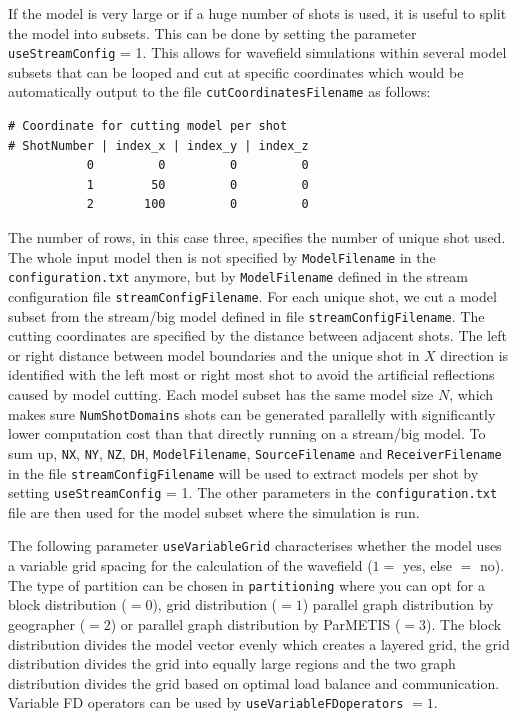 \documentclass[pdftex,a4paper,parskip,listof=totoc,bibliography=totoc,onehalfspacing,12pt]{scrreprt}
\newcommand{\shellcmd}[1]{\indent\indent\texttt{#1}}	%
\begin{document}
If the model is very large or if a huge number of shots is used, it is useful to split the model into subsets. This can be done by setting the parameter \verb+useStreamConfig+ = 1. This allows for wavefield simulations within several model subsets that can be looped and cut at specific coordinates which would be automatically output to the file \verb+cutCoordinatesFilename+ as follows:
\begin{verbatim}
# Coordinate for cutting model per shot 
# ShotNumber | index_x | index_y | index_z
           0         0         0         0
           1        50         0         0
           2       100         0         0
\end{verbatim}
The number of rows, in this case three, specifies the number of unique shot used. The whole input model then is not specified by \verb+ModelFilename+ in the \shellcmd{configuration.txt} anymore, but by \verb+ModelFilename+ defined in the stream configuration file \verb+streamConfigFilename+. For each unique shot, we cut a model subset from the stream/big model defined in file \verb+streamConfigFilename+. The cutting coordinates are specified by the distance between adjacent shots. The left or right distance between model boundaries and the unique shot in $X$ direction is identified with the left most or right most shot to avoid the artificial reflections caused by model cutting. Each model subset has the same model size $N$, which makes sure \verb+NumShotDomains+ shots can be generated parallelly with significantly lower computation cost than that directly running on a stream/big model. To sum up, \verb+NX+, \verb+NY+, \verb+NZ+, \verb+DH+, \verb+ModelFilename+, \verb+SourceFilename+ and \verb+ReceiverFilename+ in the file \verb+streamConfigFilename+ will be used to extract models per shot by setting \verb+useStreamConfig+ = 1. The other parameters in the \shellcmd{configuration.txt} file are then used for the model subset where the simulation is run. 

The following parameter \verb+useVariableGrid+ characterises whether the model uses a variable grid spacing for the calculation of the wavefield ($1=$ yes, else $=$ no). 
The type of partition can be chosen in \verb+partitioning+ where you can opt for a block distribution ($=0$), grid distribution ($=1$) parallel graph distribution by geographer ($=2$) or parallel graph distribution by ParMETIS ($=3$).
The block distribution divides the model vector evenly which creates a layered grid, the grid distribution divides the grid into equally large regions and the two graph distribution divides the grid based on optimal load balance and communication.
Variable FD operators can be used by \verb+useVariableFDoperators+ $=1$.
\end{document}
